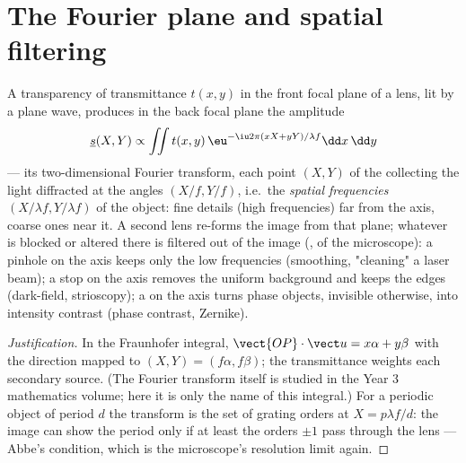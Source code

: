 \section{The Fourier plane and spatial filtering}

\begin{proposition}\label{prop:b2:diffraction:fourier}
A transparency of transmittance $t(x, y)$ in the front focal plane of a
lens, lit by a plane wave, produces in the back focal plane the
amplitude
\[
\underline s(X, Y) \propto \iint t(x, y)\,\eu^{-\iu2\pi(xX + yY)/\lambda f}\dd x\,\dd y
\]
--- its two-dimensional Fourier transform, each point $(X, Y)$ of the
\emph{} collecting the light diffracted at the angles
$(X/f, Y/f)$, i.e.\ the \emph{spatial frequencies} $(X/\lambda f, Y/\lambda f)$ of
the object: fine details (high frequencies) far from the axis, coarse
ones near it. A second lens re-forms the image from that plane; whatever
is blocked or altered there is filtered out of the image
(\emph{},  of the microscope): a pinhole
on the axis keeps only the low frequencies (smoothing, "cleaning" a
laser beam); a stop on the axis removes the uniform background and
keeps the edges (dark-field, strioscopy); a  on the
axis turns phase objects, invisible otherwise, into intensity contrast
(phase contrast, Zernike).
\end{proposition}

\begin{proof}[Justification]
In the Fraunhofer integral, $\vect{OP}\cdot\vect u = x\alpha + y\beta$ with the
direction mapped to $(X, Y) = (f\alpha, f\beta)$; the transmittance weights
each secondary source. (The Fourier transform itself is studied in the
Year 3 mathematics volume; here it is only the name of this integral.)
For a periodic object of period $d$ the transform is the set of grating
orders at $X = p\lambda f/d$: the image can show the period only if at least
the orders $\pm1$ pass through the lens --- Abbe's condition, which is
the microscope's resolution limit again.
\end{proof}

